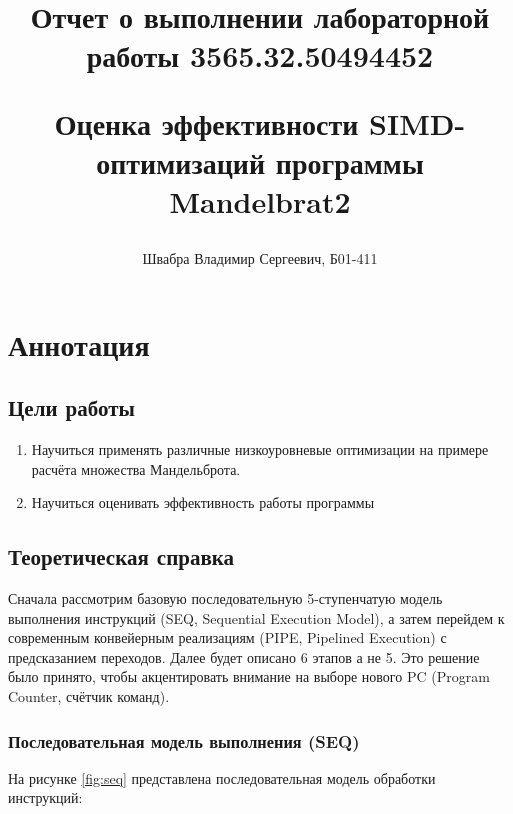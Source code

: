 \documentclass[12pt,a4paper]{article}
\title{
    Отчет о выполнении лабораторной работы 3565.32.50494452
    
    Оценка эффективности SIMD-оптимизаций программы Mandelbrat2
    }
\author{Швабра Владимир Сергеевич, Б01-411}
\begin{document}
\maketitle

\newpage

\tableofcontents

\newpage

\section{Аннотация}
\subsection{Цели работы}  
\begin{enumerate}
    \item Научиться применять различные низкоуровневые оптимизации на примере расчёта множества Мандельброта.
    \item Научиться оценивать эффективность работы программы
\end{enumerate}

\subsection{Теоретическая справка}

Сначала рассмотрим базовую последовательную 5-ступенчатую модель выполнения инструкций (SEQ, Sequential Execution Model), а затем перейдем к современным конвейерным реализациям (PIPE, Pipelined Execution) с предсказанием переходов. Далее будет описано 6 этапов а не 5. Это решение было принято, чтобы акцентировать внимание на выборе нового PC (Program Counter, счётчик команд).

\subsubsection{Последовательная модель выполнения (SEQ)}
На рисунке \ref{fig:seq} представлена последовательная модель обработки инструкций:
\end{document}
